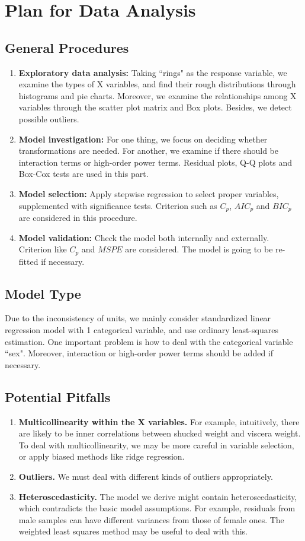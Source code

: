 \documentclass[12pt]{article}
\begin{document}
\section{Plan for Data Analysis}
\subsection{General Procedures}
\begin{enumerate}[\bf 1.]
	\item \textbf{Exploratory data analysis:} Taking ``rings" as the response variable, we examine the types of X variables, and find their rough distributions through histograms and pie charts. Moreover, we examine the relationships among X variables through the scatter plot matrix and Box plots. Besides, we detect possible outliers.
	\item \textbf{Model investigation:} For one thing, we focus on deciding whether transformations are needed. For another, we examine if there should be interaction terms or high-order power terms. Residual plots, Q-Q plots and Box-Cox tests are used in this part.
	\item \textbf{Model selection:} Apply stepwise regression to select proper variables, supplemented with significance tests. Criterion such as $C_p$, $AIC_p$ and $BIC_p$ are considered in this procedure.
	\item \textbf{Model validation:} Check the model both internally and externally. Criterion like $C_p$ and $MSPE$ are considered. The model is going to be re-fitted if necessary.
\end{enumerate}

\subsection{Model Type}
Due to the inconsistency of units, we mainly consider standardized linear regression model with 1 categorical variable, and use ordinary least-squares estimation. One important problem is how to deal with the categorical variable ``sex". Moreover, interaction or high-order power terms should be added if necessary.

\subsection{Potential Pitfalls}
\begin{enumerate}[\bf 1.]
	\item \textbf{Multicollinearity within the X variables.} For example, intuitively, there are likely to be inner correlations between shucked weight and viscera weight. To deal with multicollinearity, we may be more careful in variable selection, or apply biased methods like ridge regression.
	\item \textbf{Outliers.} We must deal with different kinds of outliers appropriately.
	\item \textbf{Heteroscedasticity.} The model we derive might contain heteroscedasticity, which contradicts the basic model assumptions. For example, residuals from male samples can have different variances from those of female ones. The weighted least squares method may be useful to deal with this.
\end{enumerate}
\end{document}
